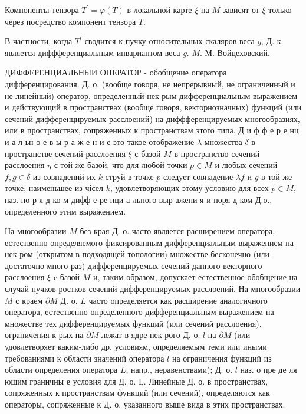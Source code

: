 \documentclass[10pt]{article}
\begin{document}
Компоненты тензора $T^{\prime}=\varphi(T)$ в локальной карте $\xi$ на $M$ зависят от $\xi$ только через посредство компонент тензора $T$.



В частности, когда $T^{\prime}$ сводится к пучку относительных скаляров веса $g$, Д. к. является диффференциальным инвариантом веса $g$. $M$. М. Войцеховский.



ДИФФЕРЕНЦИАЛЬНЫИ ОПЕРАТОР - обобщение оператора дифференцирования. Д. о. (вообще говоря, не непрерывный, не ограниченный и не линейный) оператор, определенный нек-рым дифференциальным выражением и действующий в пространствах (вообще говоря, векторнозначных) функций (или сечений дифференцируемых расслоений) на диффференцируемых многообразиях, или в пространствах, сопряженных к пространствам этого типа. Д и ф ф е р е нц и а л ьн о е в ы р а ж е н и е-это такое отображение $\lambda$ множества $\delta$ в пространстве сечений расслоения $\xi$ с базой $M$ в пространство сечений расслоения $\eta$ с той же базой, что для любой точки $p \in M$ и любых сечений $f, g \in \delta$ из совпадений их $k$-струй в точке $p$ следует совпадение $\lambda f$ и $g$ в той же точке; наименьшее из чісел $k$, удовлетворяющих этому условию для всех $p \in M$, наз. по р я д ко м дифф е ре нци а льного выр ажени я и поря д ком Д.о., определенного этим выражением.



На многообразии $M$ без края Д. о. часто является расширением оператора, естественно определяемого фиксированным дифференциальным выражением на нек-ром (открытом в подходящей топологии) множестве бесконечно (или достаточно много раз) дифференцируемых сечений данного векторного расслоения $\xi$ c базой $M$ и, таким образом, допускает естественное обобщение на случай пучков ростков сечений дифференцируемых расслоений. На многообразии $M$ с краем $\partial M$ Д. о. $L$ часто определяется как расширение аналогичного оператора, естественно определенного дифференциальным выражением на множестве тех дифференцируемых функций (или сечений расслоения), ограничения к-рых на $\partial M$ лежат в ядре нек-рого Д. о. $l$ на $\partial M$ (или удовлетворяет каким-либо др. условиям, определяемым теми или иными требованиями к области значений оператора $l$ на ограничения функций из области определения оператора $L$, напр., неравенствами); Д. о. $l$ наз. о пре де ля юшим граничны е условия для Д. о. L. Линейные Д. о. в пространствах, сопряженных к пространствам функций (или сечений), определяются как операторы, сопряженные к Д. о. указанного выше вида в этих пространствах.
\end{document}
